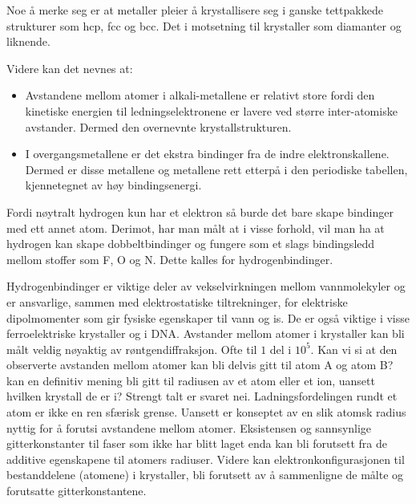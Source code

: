 \documentclass{article}
\begin{document}
Noe å merke seg er at metaller pleier å krystallisere seg i ganske tettpakkede strukturer som hcp, fcc og bcc. Det i motsetning til krystaller som diamanter og liknende.

Videre kan det nevnes at:
\begin{itemize}
    \item Avstandene mellom atomer i alkali-metallene er relativt store fordi den kinetiske energien til ledningselektronene er lavere ved større inter-atomiske avstander. Dermed den overnevnte krystallstrukturen.
    \item I overgangsmetallene er det ekstra bindinger fra de indre elektronskallene. Dermed er disse metallene og metallene rett etterpå i den periodiske tabellen, kjennetegnet av høy bindingsenergi.
\end{itemize}
Fordi nøytralt hydrogen kun har et elektron så burde det bare skape bindinger med ett annet atom. Derimot, har man målt at i visse forhold, vil man ha at hydrogen kan skape dobbeltbindinger og fungere som et slags bindingsledd mellom stoffer som F, O og N. Dette kalles for hydrogenbindinger.

Hydrogenbindinger er viktige deler av vekselvirkningen mellom vannmolekyler og er ansvarlige, sammen med elektrostatiske tiltrekninger, for elektriske dipolmomenter som gir fysiske egenskaper til vann og is. De er også viktige i visse ferroelektriske krystaller og i DNA.
Avstander mellom atomer i krystaller kan bli målt veldig nøyaktig av røntgendiffraksjon. Ofte til $1$ del i $10^5$. Kan vi si at den observerte avstanden mellom atomer kan bli delvis gitt til atom A og atom B? kan en definitiv mening bli gitt til radiusen av et atom eller et ion, uansett hvilken krystall de er i? Strengt talt er svaret nei. Ladningsfordelingen rundt et atom er ikke en ren sfærisk grense. Uansett er konseptet av en slik atomsk radius nyttig for å forutsi avstandene mellom atomer. Eksistensen og sannsynlige gitterkonstanter til faser som ikke har blitt laget enda kan bli forutsett fra de additive egenskapene til atomers radiuser. Videre kan elektronkonfigurasjonen til bestanddelene (atomene) i krystaller, bli forutsett av å sammenligne de målte og forutsatte gitterkonstantene.
\end{document}
